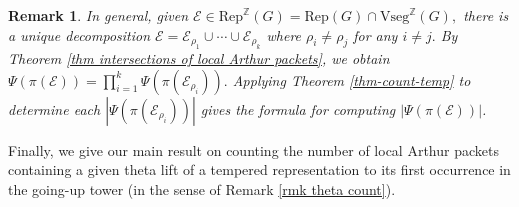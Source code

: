 \documentclass[11pt,letterpaper]{amsart}
\newcommand{\Z}{\mathbb{Z}}
\newcommand{\Vseg}{{\mathrm{Vseg}}}
\newcommand{\Rep}{{\mathrm{Rep}}}
\newcommand{\EE}{\mathcal{E}}
\newtheorem{rmk}[thm]{Remark}
\numberwithin{equation}{section}
\begin{document}
\begin{rmk}
    In general, given $\EE\in\Rep^\Z(G)=\Rep(G)\cap\Vseg^\Z(G),$ there is a unique decomposition $\EE=\EE_{\rho_1}\cup\cdots\cup\EE_{\rho_k}$ where $\rho_i\neq\rho_j$ for any $i\neq j.$ By Theorem \ref{thm intersections of local Arthur packets}, we obtain $\Psi(\pi(\EE))=\prod_{i=1}^k\Psi(\pi(\EE_{\rho_i})).$ Applying Theorem \ref{thm-count-temp} to determine each $|\Psi(\pi(\EE_{\rho_i}))|$ gives the formula for computing $|\Psi(\pi(\EE))|$.
\end{rmk}


Finally, we give our main result on counting the number of local Arthur packets containing a given theta lift of a tempered representation to its first occurrence in the going-up tower (in the sense of Remark \ref{rmk theta count}).
\end{document}

